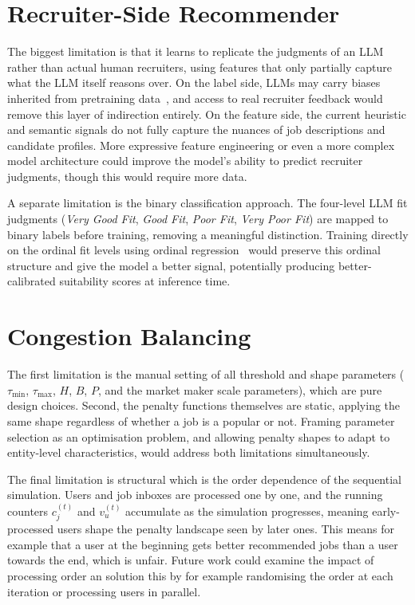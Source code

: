 \section{Recruiter-Side Recommender}

The biggest limitation is that it learns to replicate the judgments of an \gls{LLM} rather than actual human recruiters, using 
features that only partially capture what the LLM itself reasons over. On the label 
side, \glspl{LLM} may carry biases inherited from pretraining 
data~\cite{iso2025evaluatingbiasllmsjobresume}, and access to real recruiter feedback 
would remove this layer of indirection entirely. On the feature side, the current 
heuristic and semantic signals do not fully capture the nuances of job descriptions 
and candidate profiles. More expressive feature engineering or even a more complex model architecture could improve the model's ability to predict recruiter judgments, though this would require more data. 

A separate limitation is the binary classification approach. The four-level \gls{LLM} 
fit judgments (\textit{Very Good Fit}, \textit{Good Fit}, \textit{Poor Fit}, 
\textit{Very Poor Fit}) are mapped to binary labels before training, removing a 
meaningful distinction. Training directly on the ordinal fit levels using ordinal 
regression~\cite{wang2025surveyordinalregressionapplications} would preserve this 
ordinal structure and give the model a better signal, potentially producing 
better-calibrated suitability scores at inference time.

\section{Congestion Balancing}

The first limitation is the manual setting of all threshold and 
shape parameters ($\tau_{\min}$, $\tau_{\max}$, $H$, $B$, $P$, and the market maker 
scale parameters), which are pure design choices.
Second, the penalty functions themselves are static, applying the same shape 
regardless of whether a job is a popular or not. Framing 
parameter selection as an optimisation problem, and allowing penalty shapes to 
adapt to entity-level characteristics, would address both limitations simultaneously.

The final limitation is structural which is the order dependence of the sequential simulation. Users 
and job inboxes are processed one by one, and the running counters $c_j^{(t)}$ and 
$v_u^{(t)}$ accumulate as the simulation progresses, meaning early-processed users 
shape the penalty landscape seen by later ones. This means for example that a user at the beginning gets better recommended jobs than a user towards the end, which is unfair. Future work could examine the impact of processing order an solution this by for example randomising the order at each iteration or processing users in parallel.
